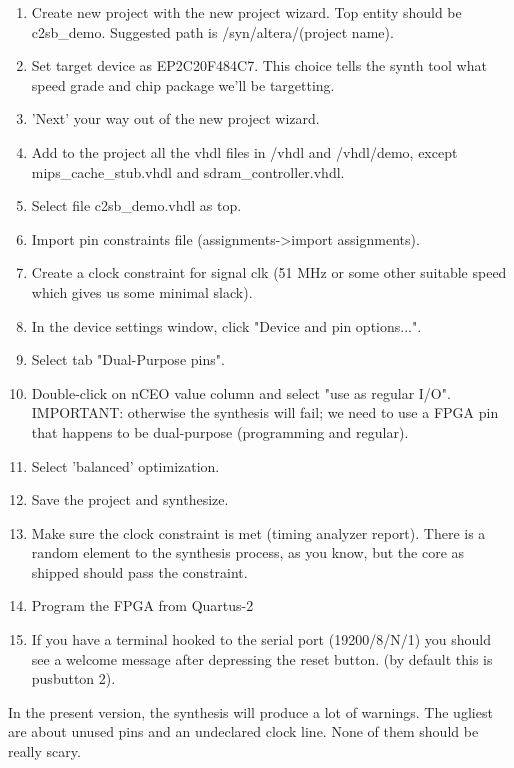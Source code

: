     \begin{enumerate}
        \item Create new project with the new project wizard.
            Top entity should be c2sb\_demo.
            Suggested path is /syn/altera/(project name).
        \item Set target device as EP2C20F484C7.
            This choice tells the synth tool what speed grade and chip package
            we'll be targetting.
        \item 'Next' your way out of the new project wizard.
        \item Add to the project all the vhdl files in /vhdl and /vhdl/demo, 
              except mips\_cache\_stub.vhdl and sdram\_controller.vhdl.
        \item Select file c2sb\_demo.vhdl as top.
        \item Import pin constraints file (assignments-\textgreater import assignments).
        \item Create a clock constraint for signal clk (51 MHz or some other
            suitable speed which gives us some minimal slack).
        \item In the device settings window, click "Device and pin options...".
        \item Select tab "Dual-Purpose pins".
        \item Double-click on nCEO value column and select "use as regular I/O".
            IMPORTANT: otherwise the synthesis will fail; we need to use a FPGA
            pin that happens to be dual-purpose (programming and regular).
        \item Select 'balanced' optimization.
        \item Save the project and synthesize.
        \item Make sure the clock constraint is met (timing analyzer report).
            There is a random element to the synthesis process, as you know,
            but the core as shipped should pass the constraint.
        \item Program the FPGA from Quartus-2
        \item If you have a terminal hooked to the serial port (19200/8/N/1) you
            should see a welcome message after depressing the reset button.
            (by default this is pusbutton 2).

    \end{enumerate}
    
    In the present version, the synthesis will produce a lot of warnings. The 
    ugliest are about unused pins and an undeclared clock line. None of them 
    should be really scary.\\

